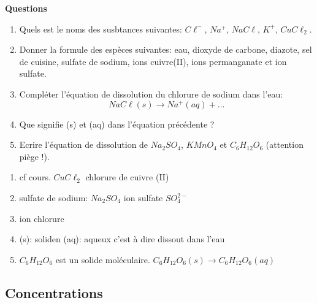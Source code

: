 \documentclass[
]{book}
\providecommand{\tightlist}{%
  \setlength{\itemsep}{0pt}\setlength{\parskip}{0pt}}
\def\tightlist{}
\begin{document}
\begin{blackbox}

\begin{center}
\textbf{Questions}

\end{center}

\begin{enumerate}
\def\labelenumi{\arabic{enumi}.}
\tightlist
\item
  Quels est le noms des susbtances suivantes: \(C\ell^-\), \(Na^+\), \(NaC\ell\), \(K^+\), \(CuC\ell_2\).
\item
  Donner la formule des espèces suivantes: eau, dioxyde de carbone, diazote, sel de cuisine, sulfate de sodium, ions cuivre(II), ions permanganate et ion sulfate.
\item
  Compléter l'équation de dissolution du chlorure de sodium dans l'eau: \[NaC\ell(s)\longrightarrow Na^+(aq) + ...\]
\item
  Que signifie (s) et (aq) dans l'équation précédente ?
\item
  Ecrire l'équation de dissolution de \(Na_2SO_4\), \(KMnO_4\) et \(C_6H_{12}O_6\) (attention piège !).
\end{enumerate}

\end{blackbox}

\begin{enumerate}
\def\labelenumi{\arabic{enumi}.}
\tightlist
\item
  cf cours. \(CuC\ell_2\) chlorure de cuivre (II)
\item
  sulfate de sodium: \(Na_2SO_4\) ion sulfate \(SO_4^{2-}\)
\item
  ion chlorure
\item
  (s): soliden (aq): aqueux c'est à dire dissout dans l'eau
\item
  \(C_6H_{12}O_6\) est un solide moléculaire. \(C_6H_{12}O_6(s)\longrightarrow C_6H_{12}O_6(aq)\)
\end{enumerate}

\hypertarget{concentrations}{%
\subsection{Concentrations}\label{concentrations}}
\end{document}
